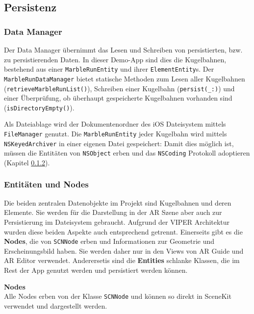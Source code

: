 \subsection{Persistenz}

\subsubsection{Data Manager} \label{subsub:umsetzung-datamanager}

Der Data Manager übernimmt das Lesen und Schreiben von persistierten, bzw. zu persistierenden Daten.
In dieser Demo-App sind dies die Kugelbahnen, bestehend aus einer \texttt{MarbleRunEntity} und ihrer \texttt{ElementEntity}s.
Der \texttt{MarbleRunDataManager} bietet statische Methoden zum Lesen aller Kugelbahnen (\texttt{retrieveMarbleRunList()}), Schreiben einer Kugelbahn (\texttt{persist(\_:)}) und einer Überprüfung, ob überhaupt gespeicherte Kugelbahnen vorhanden sind (\texttt{isDirectoryEmpty()}).

Als Dateiablage wird der Dokumentenordner des iOS Dateisystem mittels \texttt{FileManager} genutzt.
Die \texttt{MarbleRunEntity} jeder Kugelbahn wird mittels \texttt{NSKeyedArchiver} in einer eigenen Datei gespeichert:
Damit dies möglich ist, müssen die Entitäten von \texttt{NSObject} erben und das \texttt{NSCoding} Protokoll adoptieren (Kapitel \ref{subsub:umsetzung-entities-nodes}).

\subsubsection{Entitäten und Nodes} \label{subsub:umsetzung-entities-nodes}

Die beiden zentralen Datenobjekte im Projekt sind Kugelbahnen und deren Elemente.
Sie werden für die Darstellung in der AR Szene aber auch zur Persistierung im Dateisystem gebraucht.
Aufgrund der VIPER Architektur wurden diese beiden Aspekte auch entsprechend getrennt.
Einerseits gibt es die \textbf{Nodes}, die von \texttt{SCNNode} erben und Informationen zur Geometrie und Erscheinungsbild haben.
Sie werden daher nur in den Views von AR Guide und AR Editor verwendet.
Anderersetis sind die \textbf{Entities} schlanke Klassen, die im Rest der App genutzt werden und persistiert werden können.

\textbf{Nodes} \\
Alle Nodes erben von der Klasse \texttt{SCNNode} und können so direkt in SceneKit verwendet und dargestellt werden.

